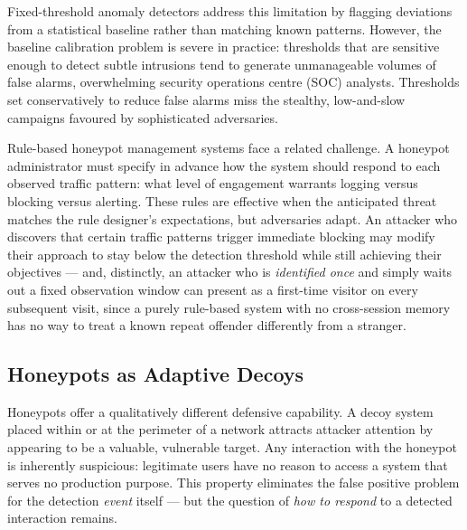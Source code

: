 Fixed-threshold anomaly detectors address this limitation by flagging deviations
from a statistical baseline rather than matching known patterns.
However, the baseline calibration problem is severe in practice: thresholds
that are sensitive enough to detect subtle intrusions tend to generate
unmanageable volumes of false alarms, overwhelming security operations centre
(SOC) analysts.
Thresholds set conservatively to reduce false alarms miss the stealthy,
low-and-slow campaigns favoured by sophisticated adversaries.

Rule-based honeypot management systems face a related challenge.
A honeypot administrator must specify in advance how the system should respond
to each observed traffic pattern: what level of engagement warrants logging
versus blocking versus alerting.
These rules are effective when the anticipated threat matches the rule designer's
expectations, but adversaries adapt.
An attacker who discovers that certain traffic patterns trigger immediate
blocking may modify their approach to stay below the detection threshold
while still achieving their objectives --- and, distinctly, an attacker who
is \emph{identified once} and simply waits out a fixed observation window can
present as a first-time visitor on every subsequent visit, since a purely
rule-based system with no cross-session memory has no way to treat a known
repeat offender differently from a stranger.

\subsection{Honeypots as Adaptive Decoys}

Honeypots offer a qualitatively different defensive capability.
A decoy system placed within or at the perimeter of a network attracts
attacker attention by appearing to be a valuable, vulnerable target.
Any interaction with the honeypot is inherently suspicious: legitimate users
have no reason to access a system that serves no production purpose.
This property eliminates the false positive problem for the detection
\emph{event} itself --- but the question of \emph{how to respond} to a
detected interaction remains.

